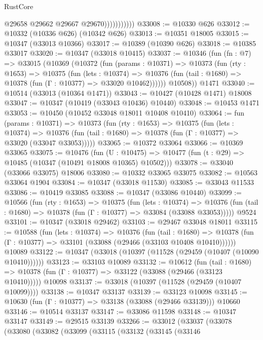 \begin{lexlean}{RustCore}
\begin{coremodule}
                          @29658
                          @29662
                          @29667
                          @29670)))))))))))
@33008 := @10330 @626
@33012 := @10332 (@10336 @626) (@10342 @626)
@33013 := @10351 @18005
@33015 := @10347 (@33013 @10366)
@33017 := @10389 (@10390 @626)
@33018 := @10385 @33017
@33020 := @10347 (@33018 @10415)
@33037 := @10346
    (fun (fn : @7) =>
    @33015
      (@10369
        (@10372
          (fun (params : @10371) =>
          @10373
            (fun (rty : @1653) =>
            @10375
              (fun (lets : @10374) =>
              @10376 (fun (tail : @1680) => @10378 (fun (Γ : @10377) => @33020 @10462))))))
        @10508))
    @1471
@33040 := @10514 (@33013 (@10364 @1471))
@33043 := @10427 (@10428 @1471) @18008
@33047 := @10347 (@10419 (@33043 @10436) @10440)
@33048 := @10453 @1471
@33053 := @10450 (@10452 @33048 @18011 @10408 @10410)
@33064 := fun (params : @10371) =>
  @10373
    (fun (rty : @1653) =>
    @10375
      (fun (lets : @10374) =>
      @10376 (fun (tail : @1680) => @10378 (fun (Γ : @10377) => @33020 (@33047 @33053)))))
@33065 := @10372 @33064
@33066 := @10369 @33065
@33075 := @10476
    (fun (U : @10475) => @10477 (fun (t : @29) => @10485 (@10347 (@10491 @18008 @10365) @10502)))
@33078 := @33040 (@33066 @33075) @18006
@33080 := @10332 @33065 @33075
@33082 := @10563 @33064 @1904
@33084 := @10347 (@33018 @11530)
@33085 := @33043 @11533
@33086 := @10419 @33085
@33088 := @10347 (@33086 @10440)
@33099 := @10566
    (fun (rty : @1653) =>
    @10375
      (fun (lets : @10374) =>
      @10376 (fun (tail : @1680) => @10378 (fun (Γ : @10377) => @33084 (@33088 @33053)))))
    @9524
@33101 := @10347 (@33018 @29462)
@33103 := @29467 @33048 @18011
@33115 := @10588
    (fun (lets : @10374) =>
    @10376
      (fun (tail : @1680) =>
      @10378 (fun (Γ : @10377) => @33101 (@33088 (@29466 (@33103 @10408 @10410))))))
    @10089
@33122 := @10347 (@33018 (@10397 (@11528 (@29459 (@10407 (@10090 @10410))))))
@33123 := @33103 @10089
@33132 := @10612
    (fun (tail : @1680) => @10378 (fun (Γ : @10377) => @33122 (@33088 (@29466 (@33123 @10410)))))
    @10098
@33137 := @33018 (@10397 (@11528 (@29459 (@10407 @10099))))
@33138 := @10347 @33137
@33139 := @33123 @10098
@33145 := @10630 (fun (Γ : @10377) => @33138 (@33088 (@29466 @33139))) @10660
@33146 := @10514 @33137
@33147 := @33086 @11598
@33148 := @10347 @33147
@33149 := @29515 @33139
@33266 := @33012
    (@33037
      (@33078
        (@33080
          (@33082
            (@33099
              (@33115
                (@33132
                  (@33145
                    (@33146

\end{coremodule}
\end{lexlean}
